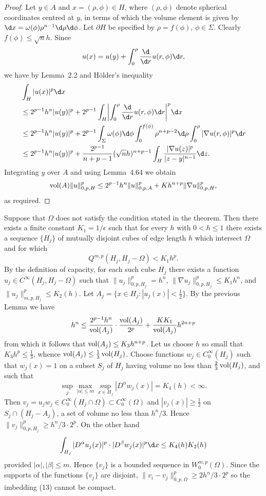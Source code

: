 \begin{proof}
  Let $y\in A$ and $x=(\rho,\phi)\in H$, where $(\rho,\phi)$ denote spherical coordinates
  centred at $y$, in terms of which the volume element is given by
  $\d x = \omega(\phi) \rho^{n-1} \d\rho\d\phi$. Let $\partial H$ be specified by $\rho = f(\phi)$,
  $\phi\in\Sigma$. Clearly $f(\phi) \leq\sqrt{n}h$. Since
  \[ u(x) = u(y) + \int_0^\rho \frac{\d}{\d r} u(r,\phi) \d r, \]
  we have by Lemma~2.2 and H\"older's inequality
  \begin{align*}
    & \int_H |u(x)|^p \d x \\
    & \leq 2^{p-1} h^n |u(y)|^p + 2^{p-1} \int_H \biggl|\int_0^\rho
        \frac{\d}{\d r} u(r,\phi) \d r\biggr|^p \d x \\
    & \leq 2^{p-1} h^n |u(y)|^p + 2^{p-1} \int_\Sigma \omega(\phi) \d\phi
        \int_0^{f(\phi)} \rho^{n+p-2} \d\rho \int_0^\rho |\nabla u(r,\phi)|^p \d r \\
    & \leq 2^{p-1} h^n |u(y)|^p + \frac{2^{p-1}}{n+p-1} (\sqrt{n}h)^{n+p-1}
        \int_H \frac{|\nabla u(z)|^p}{|z-y|^{n-1}} \d z.
  \end{align*}
  Integrating $y$ over $A$ and using Lemma~4.64 we obtain
  \[ \operatorname{vol}(A) \|u\|_{0,p,H}^p \leq 2^{p-1} h^n \|u\|_{0,p,A}^p
      + K h^{n+p} \|\nabla u\|_{0,p,H}^p, \]
  as required.
\end{proof}


\begin{para}
  Suppose that $\Omega$ does not satisfy the condition stated in the theorem.
  Then there exists a finite constant $K_1 = 1/\epsilon$ such that for every $h$
  with $0<h\leq 1$ there exists a sequence $\{H_j\}$ of mutually disjoint cubes of
  edge length $h$ which intersect $\Omega$ and for which
  \[ Q^{m,p}(H_j, H_j-\Omega) < K_1 h^p. \]
  By the definition of capacity, for each such cube $H_j$ there exists a function
  $u_j\in C^\infty(H_j,H_j-\Omega)$ such that $\|u_j\|_{0,p,H_j}^p = h^n$,
  $\|\nabla u_j\|_{0,p,H_j}^p \leq K_1h^n$, and $\|u_j\|_{m,p,H_j}^p\leq K_2(h)$.
  Let $A_j = \{x\in H_j: |u_j(x)|<\frac12\}$. By the previous Lemma we have
  \[ h^n \leq \frac{2^{p-1}h^n}{\operatorname{vol}(A_j)} \cdot \frac{\operatorname{vol}(A_j)}{2^p} 
      + \frac{KK_1}{\operatorname{vol}(A_j)} h^{2n+p} \]
  from which it follows that $\operatorname{vol}(A_j) \leq K_3 h^{n+p}$.
  Let us choose $h$ so small that $K_3 h^p\leq\frac13$, whence $\operatorname{vol}(A_j) \leq \frac13 \operatorname{vol}(H_j)$.
  Choose functions $w_j\in C_0^\infty(H_j)$ such that $w_j(x)=1$ on a subset $S_j$ of $H_j$
  having volume no less than $\frac23 \operatorname{vol}(H_j)$, and such that
  \[ \sup_j \max_{|\alpha|\leq m} \sup_{x\in H_j} |D^\alpha w_j(x)| = K_4(h) < \infty. \]
  Then $v_j = u_jw_j \in C_0^\infty(H_j\cap\Omega)\subset C_0^\infty(\Omega)$
  and $|v_j(x)|\geq\frac12$ on $S_j\cap (H_j-A_j)$, a set of volume no less than
  $h^n/3$. Hence $\|v_j\|_{0,p,H_j}^p \geq h^n/3 \cdot 2^p$. On the other hand
  \[ \int_{H_j} |D^\alpha u_j(x)|^p \cdot |D^\beta w_j(x)|^p \d x
      \leq K_4(h) K_2(h) \]
  provided $|\alpha|,|\beta|\leq m$. Hence $\{v_j\}$ is a bounded sequence in $W_0^{m,p}(\Omega)$.
  Since the supports of the functions $\{v_j\}$ are disjoint,
  $\|v_i-v_j\|_{0,p,\Omega}^p \geq 2h^n/3 \cdot 2^p$ so the imbedding (13)
  cannot be compact.
\end{para}


